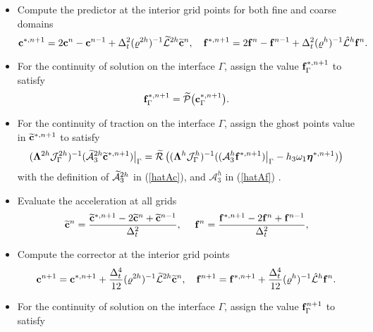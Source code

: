 \begin{breakablealgorithm}
	\begin{itemize}
		\item  {Compute the predictor at the interior grid points for both fine and coarse domains
			\begin{equation*}
			{\bf c}^{*,n+1} = 2{\bf c}^{n} - {\bf c}^{n-1} + \Delta_t^2(\varrho^{2h})^{-1}{\wt{\mathcal{L}}}^{2h} \wt{\bf{c}}^{n},\ \ \ 
			{\bf f}^{*,n+1} = 2{\bf f}^{n} - {\bf f}^{n-1} + \Delta_t^2(\varrho^h)^{-1}\hat{\mathcal{L}}^{h} {\bf{f}}^{n}.
			\end{equation*}
		}
		\item{For the continuity of solution on the interface $\Gamma$, assign the value ${\bf f}_{\Gamma}^{*,n+1}$ to satisfy
			\begin{equation*}
			{\bf f}^{*,n+1}_{\Gamma} = \widetilde{\mathcal{P}}\big({\bf c}^{*,n+1}_{\Gamma}\big).
			\end{equation*}
		}
		\item{For the continuity of traction on the interface $\Gamma$, assign the ghost points value in $\widetilde{\bf c}^{*,n+1}$ to satisfy
			\begin{equation}\label{traction_gamma_pre}
			(\bm{\Lambda}^{2h}{\mathcal J}_{\Gamma}^{2h})^{-1}(\wt{\mathcal{A}}_3^{2h}\wt{\bf c}^{*,n+1})\big|_\Gamma
			= \wt{\mathcal{R}}\left((\bm{\Lambda}^{h}{\mathcal J}^h_{\Gamma})^{-1}((\mathcal{A}_3^h{\bf f}^{*,n+1})\big|_\Gamma-h_3\omega_1{\bm \eta}^{\ast,n+1})\right)
			\end{equation}
			with the definition of $\widetilde{\mathcal{A}}_3^{2h}$ in (\ref{hatAc}), and $\mathcal{A}_3^h$ in (\ref{hatAf}) .
		}
		\item{Evaluate the acceleration at all grids 
			\begin{equation*}
			\widetilde{\bf c}^n= \frac{\widetilde{\bf c}^{*,n+1}-2\widetilde{\bf c}^{n}+\widetilde{\bf c}^{n-1}}{\Delta^2_t},\ \ \ \
			{\bf f}^{n} = \frac{{\bf f}^{*,n+1}-2{\bf f}^{n}+{\bf f}^{n-1}}{\Delta^2_t},
			\end{equation*}
		}
		\item{Compute the corrector at the interior grid points
			\begin{equation*}
			{\bf c}^{n+1} = {\bf c}^{*,n+1} + \frac{\Delta_t^4}{12}(\varrho^{2h})^{-1}\wt{\mathcal{L}}^{2h}\wt{\bf{c}}^{n},\ \ \ 
			{\bf f}^{n+1} = {\bf f}^{*,n+1} + \frac{\Delta_t^4}{12}(\varrho^{h})^{-1}\hat{\mathcal{L}}^{h}{\bf{f}}^{n}.
			\end{equation*}
		}
		\item{For the continuity of solution on the interface $\Gamma$, assign the value ${\bf f}^{n+1}_\Gamma$ to satisfy
}
\end{itemize}
\end{breakablealgorithm}
